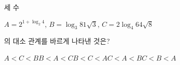 세 수 \par\smallskip\noindent\hspace*{1.5em}$A=2^{1+\log_2 4}$, $B=\log_3 81\sqrt{3}$, $C=2\log_4 64\sqrt{8}$\par\smallskip\noindent 의 대소 관계를 바르게 나타낸 것은?
\begin{choices32}{$A<C<B$}{$B<A<C$}{$B<C<A$}{$C<A<B$}{$C<B<A$}\end{choices32}
